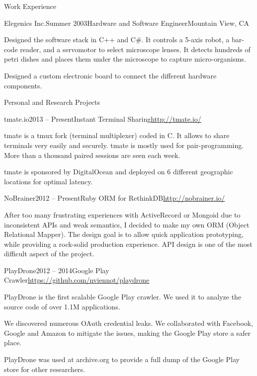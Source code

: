 \documentclass{resume} %
\begin{document}
\begin{rSection}{Work Experience}
\begin{rSubsection}{Elegenics Inc.}{Summer 2003}{Hardware and Software Engineer}{Mountain View, CA}
\item Designed the software stack in C++ and C\#. It controls a 5-axis
      robot, a bar-code reader, and a servomotor to select microscope lenses.
      It detects hundreds of petri dishes and places them under the
      microscope to capture micro-organisms.
\item Designed a custom electronic board to connect the different hardware components.
\end{rSubsection}

\end{rSection}


\begin{rSection}{Personal and Research Projects}

\begin{rSubsection}{tmate.io}{2013 -- Present}{Instant Terminal Sharing}{\url{http://tmate.io/}}
\item tmate is a tmux fork (terminal multiplexer) coded in C. It allows to share
  terminals very easily and securely. tmate is mostly used for pair-programming.
      More than a thousand paired sessions are seen each week.
\item tmate is sponsored by DigitalOcean and deployed on 6 different geographic locations for optimal latency.
\end{rSubsection}

\clearpage

\begin{rSubsection}{NoBrainer}{2012 -- Present}{Ruby ORM for RethinkDB}{\url{http://nobrainer.io/}}
\item After too many frustrating experiences with ActiveRecord or Mongoid due to
  inconsistent APIs and weak semantics, I decided to make my own ORM (Object Relational Mapper).
  The design goal is to allow quick application prototyping, while providing a rock-solid production experience.
  API design is one of the most difficult aspect of the project.
\end{rSubsection}

\begin{rSubsection}{PlayDrone}{2012 -- 2014}{Google Play Crawler}{\url{https://github.com/nviennot/playdrone}}
\item PlayDrone is the first scalable Google Play crawler. We used it to analyze the source code of over 1.1M applications.
\item We discovered numerous OAuth credential leaks. We collaborated with Facebook,
    Google and Amazon to mitigate the issues, making the Google Play store a safer place.
\item PlayDrone was used at archive.org to provide a full dump of the Google Play store for other researchers.
\end{rSubsection}


\end{rSection}
\end{document}
